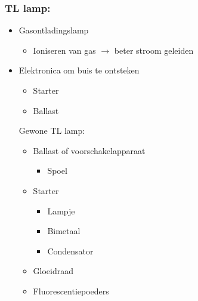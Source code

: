 \documentclass[12pt]{article}
\begin{document}
\subsubsection{TL lamp:}
\begin{itemize}
    \item Gasontladingslamp\begin{itemize}
        \item Ioniseren van gas $\rightarrow$ beter stroom geleiden
    \end{itemize}
    \item Elektronica om buis te ontsteken\begin{itemize}
        \item Starter
        \item Ballast
    \end{itemize}
    Gewone TL lamp:\begin{itemize}
        \item Ballast of voorschakelapparaat\begin{itemize}
            \item Spoel
        \end{itemize}
        \item Starter\begin{itemize}
            \item Lampje 
            \item Bimetaal 
            \item Condensator 
        \end{itemize}
        \item Gloeidraad 
        \item Fluorescentiepoeders
    \end{itemize}
\end{itemize}
\end{document}
